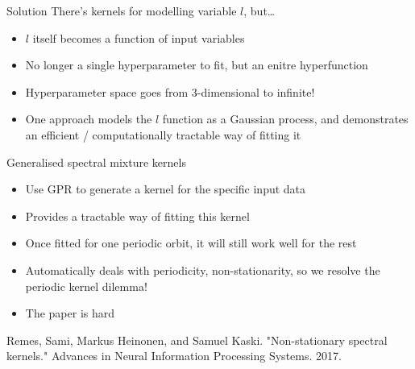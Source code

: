 \documentclass[presentation]{beamer}
\begin{document}
\begin{frame}[label={sec:org98cafa9}]{Solution}
There's kernels for modelling variable \(l\), but\ldots{}
\begin{itemize}
\item \(l\) itself becomes a function of input variables
\item No longer a single hyperparameter to fit, but an enitre hyperfunction
\item Hyperparameter space goes from 3-dimensional to infinite!
\item One approach models the \(l\) function as a Gaussian process, and demonstrates an efficient / computationally tractable way of fitting it
\end{itemize}
\end{frame}

\begin{frame}[label={sec:org10fb20b}]{Generalised spectral mixture kernels}
\begin{itemize}
\item Use GPR to generate a kernel for the specific input data
\item Provides a tractable way of fitting this kernel
\item Once fitted for one periodic orbit, it will still work well for the rest
\item Automatically deals with periodicity, non-stationarity, so we resolve the periodic kernel dilemma!
\item The paper is hard
\end{itemize}

\vfill

Remes, Sami, Markus Heinonen, and Samuel Kaski. "Non-stationary spectral kernels." Advances in Neural Information Processing Systems. 2017.
\end{frame}
\end{document}
